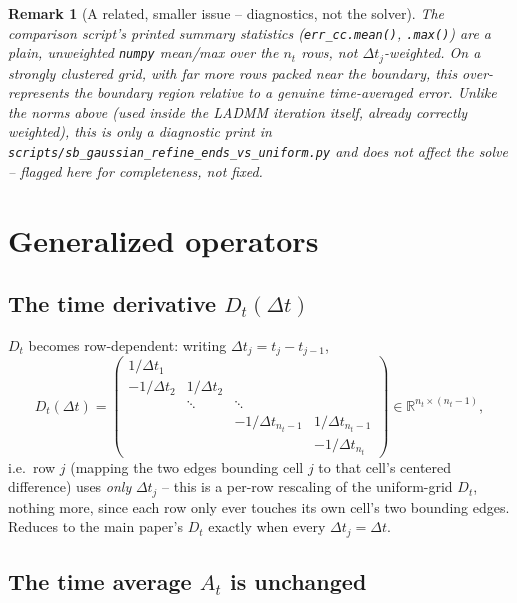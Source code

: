 \documentclass[11pt]{article}
\newtheorem{remark}{Remark}
\newcommand{\dt}{\Delta t}
\newcommand{\RR}{\mathbb{R}}
\newcommand{\code}[1]{\texttt{#1}}
\begin{document}
\begin{remark}[A related, smaller issue -- diagnostics, not the solver]
The comparison script's printed summary statistics (\code{err\_cc.mean()}, \code{.max()}) are a
plain, \emph{unweighted} \code{numpy} mean/max over the $n_t$ rows, not $\dt_j$-weighted. On a
strongly clustered grid, with far more rows packed near the boundary, this over-represents the
boundary region relative to a genuine time-averaged error. Unlike the norms above (used inside
the LADMM iteration itself, already correctly weighted), this is only a diagnostic print in
\code{scripts/sb\_gaussian\_refine\_ends\_vs\_uniform.py} and does not affect the solve --
flagged here for completeness, not fixed.
\end{remark}

\section{Generalized operators}
\label{sec:operators}

\subsection{The time derivative $D_t(\dt)$}
\label{sec:Dt}

$D_t$ becomes row-dependent: writing $\dt_j = t_j - t_{j-1}$,
\begin{equation}
  \label{eq:Dt-nonuniform}
  D_t(\dt) = \begin{pmatrix}
    1/\dt_1 & & & \\
    -1/\dt_2 & 1/\dt_2 & & \\
    & \ddots & \ddots & \\
    & & -1/\dt_{n_t-1} & 1/\dt_{n_t-1} \\
    & & & -1/\dt_{n_t}
  \end{pmatrix} \in \RR^{n_t\times(n_t-1)},
\end{equation}
i.e.\ row $j$ (mapping the two edges bounding cell $j$ to that cell's centered difference) uses
\emph{only} $\dt_j$ -- this is a per-row rescaling of the uniform-grid $D_t$, nothing more, since
each row only ever touches its own cell's two bounding edges. Reduces to the main paper's $D_t$
exactly when every $\dt_j=\dt$.

\subsection{The time average $A_t$ is unchanged}
\end{document}

